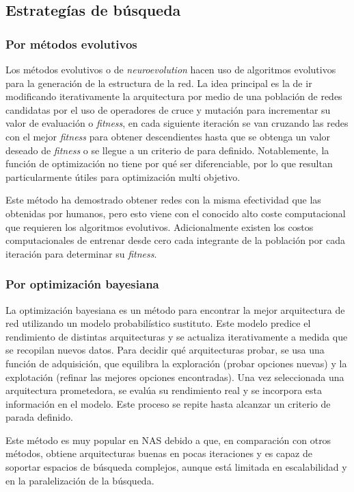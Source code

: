 \subsection{Estrategías de búsqueda}
\subsubsection{Por métodos evolutivos}
Los métodos evolutivos o de \textit{neuroevolution} hacen uso de algoritmos evolutivos para la generación de la estructura de la red. La idea principal es la de ir modificando iterativamente la arquitectura por medio de una población de redes candidatas por el uso de operadores de cruce y mutación para incrementar su valor de evaluación o \textit{fitness}, en cada siguiente iteración se van cruzando las redes con el mejor \textit{fitness} para obtener descendientes hasta que se obtenga un valor deseado de \textit{fitness} o se llegue a un criterio de para definido. Notablemente, la función de optimización no tiene por qué ser diferenciable, por lo que resultan particularmente útiles para optimización multi objetivo. 

Este método ha demostrado obtener redes con la misma efectividad que las obtenidas por humanos, pero esto viene con el conocido alto coste computacional que requieren los algoritmos evolutivos. Adicionalmente existen los costos computacionales de entrenar desde cero cada integrante de la población por cada iteración para determinar su \textit{fitness}.

\subsubsection{Por optimización bayesiana}
La optimización bayesiana es un método para encontrar la mejor arquitectura de red utilizando un modelo probabilístico sustituto. Este modelo predice el rendimiento de distintas arquitecturas y se actualiza iterativamente a medida que se recopilan nuevos datos. Para decidir qué arquitecturas probar, se usa una función de adquisición, que equilibra la exploración (probar opciones nuevas) y la explotación (refinar las mejores opciones encontradas). Una vez seleccionada una arquitectura prometedora, se evalúa su rendimiento real y se incorpora esta información en el modelo. Este proceso se repite hasta alcanzar un criterio de parada definido.

Este método es muy popular en NAS debido a que, en comparación con otros métodos, obtiene arquitecturas buenas en pocas iteraciones y es capaz de soportar espacios de búsqueda complejos, aunque está limitada en escalabilidad y en la paralelización de la búsqueda.

